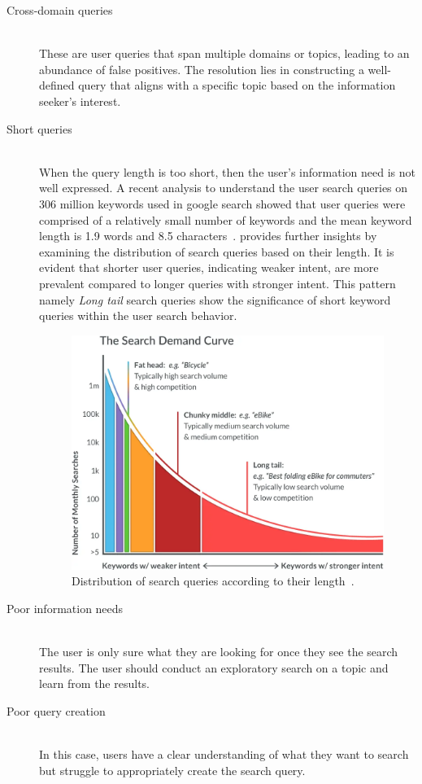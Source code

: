 \begin{description}
	\item[Cross-domain queries] \hfill \\ These are user queries that span multiple domains or topics, leading to an abundance of false positives. The resolution lies in constructing a well-defined query that aligns with a specific topic based on the information seeker's interest.
	
	\item[Short queries] \hfill \\ When the query length is too short, then the user's information need is not well expressed. A recent analysis to understand the user search queries on 306 million keywords used in google search showed that user queries were comprised of a relatively small number of keywords and the mean keyword length is 1.9 words and 8.5 characters~\cite{google_keyword}.  provides further insights by examining the distribution of search queries based on their length. It is evident that shorter user queries, indicating weaker intent, are more prevalent compared to longer queries with stronger intent. This pattern namely \emph{Long tail} search queries show the significance of short keyword queries within the user search behavior.
	
	\begin{figure}[h]
		\centering
		\includegraphics[width=.55\textwidth]{images/outside/search_demand_curve.png}
		\caption[Search query distribution]{Distribution of search queries according to their length~\cite{mozWhatKeywords}. \label{fig:longtail_keywords}}
	\end{figure} 
	
	\item[Poor information needs] \hfill \\ The user is only sure what they are looking for once they see the search results. The user should conduct an exploratory search on a topic and learn from the results.
	
	\item[Poor query creation] \hfill \\ In this case, users have a clear understanding of what they want to search but struggle to appropriately create the search query.
\end{description}


